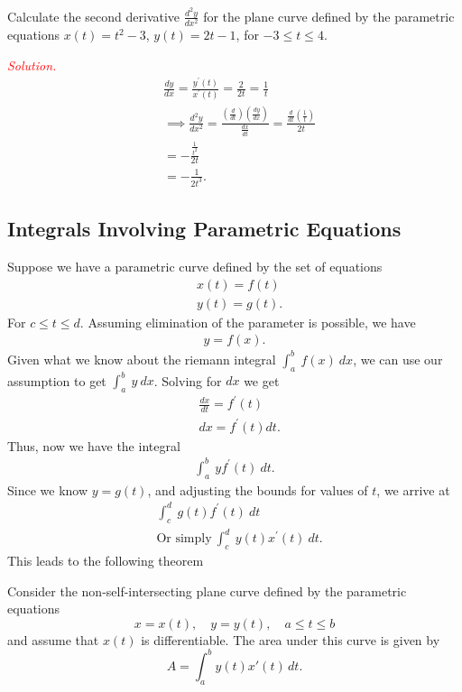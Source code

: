 \documentclass{report}
\begin{document}
    \bigbreak \noindent 
    \begin{exm}
        Calculate the second derivative \(\frac{d^2y}{dx^2}\) for the plane curve defined by the parametric equations \( x(t) = t^2 - 3 \), \( y(t) = 2t - 1 \), for \( -3 \leq t \leq 4 \).
    \end{exm}
    \bigbreak \noindent 
    \textcolor{red}{\textit{Solution.}}
    \begin{align*}
        &\frac{dy}{dx} = \frac{y^{\prime}(t)}{x^{\prime}(t)} = \frac{2}{2t} =\frac{1}{t} \\
        &\implies \frac{d^{2}y}{dx^{2}} = \frac{\left(\frac{d}{dt}\right)\left(\frac{dy}{dx}\right)}{\frac{dx}{dt}} = \frac{\frac{d}{dt}\left(\frac{1}{t}\right)}{2t} \\
        &=-\frac{\frac{1}{t^{2}}}{2t} \\
        &=-\frac{1}{2t^{3}}
    .\end{align*}

    \pagebreak 
    \subsection{Integrals Involving Parametric Equations}
    \bigbreak \noindent 
    Suppose we have a parametric curve defined by the set of equations
    \begin{align*}
        &x(t) = f(t) \\
        &y(t) = g(t)
    .\end{align*}
    \bigbreak \noindent 
    For $c \leq t \leq d$. Assuming elimination of the parameter is possible, we have
    \begin{align*}
        y = f(x)
    .\end{align*}
    \bigbreak \noindent 
    Given what we know about the riemann integral $\int_{a}^{b}\ f(x)\ dx $, we can use our assumption to get $\int_{a}^{b}\ y\ dx $. Solving for $dx$ we get
    \begin{align*}
        &\frac{dx}{dt} = f^{\prime}(t) \\
        &dx = f^{\prime}(t)dt
    .\end{align*}
    Thus, now we have the integral 
    \begin{align*}
        \int_{a}^{b}\ yf^{\prime}(t)\ dt
    .\end{align*}
    Since we know $y=g(t)$, and adjusting the bounds for values of $t$, we arrive at 
    \begin{align*}
        &\int_{c}^{d}\ g(t)f^{\prime}(t)\ dt \\
        &\text{Or simply}\ \int_{c}^{d}\ y(t)x^{\prime}(t)\ dt
    .\end{align*}
    \bigbreak \noindent 
    This leads to the following theorem
    \bigbreak \noindent 
    \begin{thrmm}
        Consider the non-self-intersecting plane curve defined by the parametric equations
        \[
            x = x(t), \quad y = y(t), \quad a \leq t \leq b
        \]
        and assume that \( x(t) \) is differentiable. The area under this curve is given by
        \[
            A = \int_{a}^{b} y(t) x'(t) \, dt.
        \]
    \end{thrmm}
\end{document}

